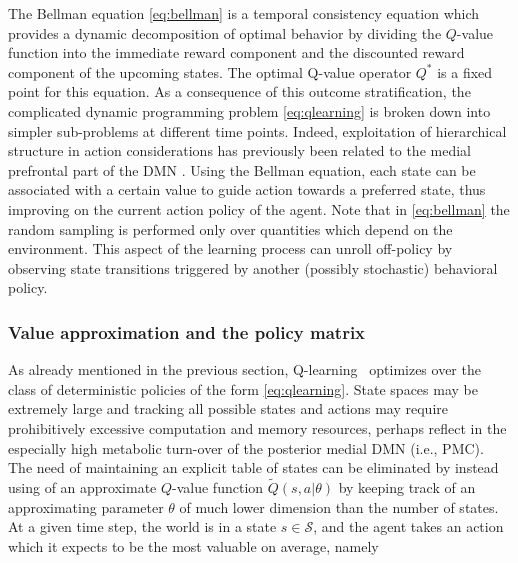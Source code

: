\documentclass[10pt,letterpaper]{article}
\begin{document}
The Bellman equation \eqref{eq:bellman} is a temporal consistency equation which provides
a dynamic decomposition of optimal behavior by dividing the $Q$-value function into the immediate
reward component and the discounted reward component of the upcoming states.
The optimal Q-value operator $Q^*$ is a fixed point for this equation.
As a consequence of this outcome stratification, the complicated dynamic programming
problem \eqref{eq:qlearning}
is broken down into simpler sub-problems at different time points.
Indeed,
exploitation of hierarchical structure in action considerations
has previously been related to the medial prefrontal part of the DMN
\citep{koechlin1999role, braver2002role}.
Using the Bellman equation, each state can be associated with a certain value
to guide action towards a preferred state, thus improving on the
current action policy of the agent.
Note that in \eqref{eq:bellman} the random sampling
is performed only over quantities which
depend on the environment.
This aspect of the learning process
can unroll off-policy by observing state transitions
triggered by another (possibly stochastic) behavioral policy.

\subsubsection{Value approximation and the policy matrix}
\label{sec:policymat}
As already mentioned in the previous section, Q-learning~\citep{watkins92} optimizes over the class of
deterministic policies of the form \eqref{eq:qlearning}. State spaces may be extremely large
and tracking all possible states and actions may require prohibitively excessive
computation and memory resources, perhaps reflect in the especially high metabolic
turn-over of the posterior medial DMN (i.e., PMC).
The need of maintaining an explicit table of
states can be eliminated by instead using of an approximate $Q$-value function $\tilde{Q}(s,a|\theta)$
by keeping track of an approximating parameter $\theta$ of much lower dimension than the number of states.
At a given time step, the world is in a state $s \in \mathcal S$, and the agent takes an
action which it expects to be the most valuable on average, namely
\end{document}

